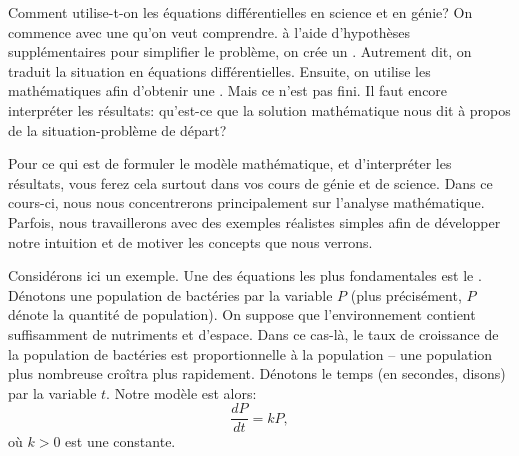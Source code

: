 Comment utilise-t-on les équations différentielles en science et en génie?  On commence avec une \emph{} qu'on veut comprendre.  à l'aide d'hypothèses supplémentaires pour simplifier le problème, on crée un 
\emph{}.  Autrement dit, on traduit la situation en équations différentielles.  Ensuite, on utilise les mathématiques afin d'obtenir une \emph{}.  Mais ce n'est pas fini.  Il faut encore interpréter les résultats: qu'est-ce que la solution mathématique nous dit à propos de la situation-problème de départ?

Pour ce qui est de formuler le modèle mathématique, et d'interpréter les résultats, vous ferez cela surtout dans vos cours de génie et de science.  Dans ce cours-ci, nous nous concentrerons principalement sur l'analyse mathématique.  Parfois, nous travaillerons avec des exemples réalistes simples afin de développer notre intuition et de motiver les concepts que nous verrons.

Considérons ici un exemple.  Une des équations les plus fondamentales est le \emph{}.  Dénotons une population de bactéries par la variable $P$ (plus précisément, $P$ dénote la quantité de population).  On suppose que l'environnement contient suffisamment de nutriments et d'espace.  Dans ce cas-là, le taux de croissance de la population de bactéries est proportionnelle à la population -- une population plus nombreuse cro\^itra plus rapidement.  Dénotons le temps (en secondes, disons) par la variable $t$.  Notre modèle est alors: 
%
\begin{equation*}
\frac{dP}{dt} = kP, 
\end{equation*}
où $k > 0$ est une constante.

